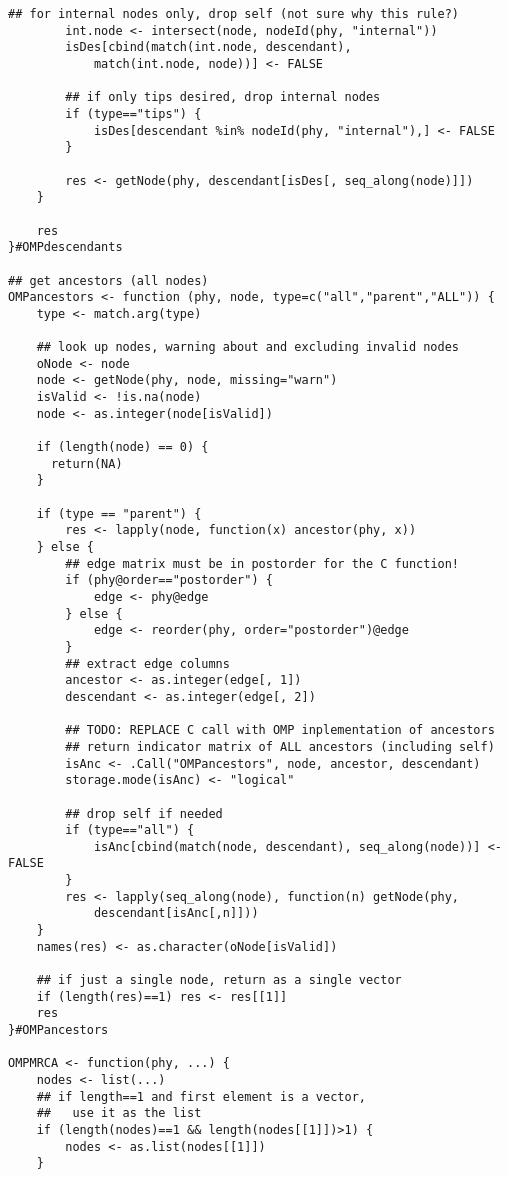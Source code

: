 \documentclass[11pt,letterpaper]{article}
\begin{document}
\begin{lstlisting}[style=MyR]
        ## for internal nodes only, drop self (not sure why this rule?)
        int.node <- intersect(node, nodeId(phy, "internal"))
        isDes[cbind(match(int.node, descendant),
            match(int.node, node))] <- FALSE
        
        ## if only tips desired, drop internal nodes
        if (type=="tips") {
            isDes[descendant %in% nodeId(phy, "internal"),] <- FALSE
        }
        
        res <- getNode(phy, descendant[isDes[, seq_along(node)]])
    }

    res
}#OMPdescendants

## get ancestors (all nodes)
OMPancestors <- function (phy, node, type=c("all","parent","ALL")) {
    type <- match.arg(type)

    ## look up nodes, warning about and excluding invalid nodes
    oNode <- node
    node <- getNode(phy, node, missing="warn")
    isValid <- !is.na(node)
    node <- as.integer(node[isValid])

    if (length(node) == 0) {
      return(NA)
    }
    
    if (type == "parent") {
        res <- lapply(node, function(x) ancestor(phy, x))
    } else {
        ## edge matrix must be in postorder for the C function!
        if (phy@order=="postorder") {
            edge <- phy@edge
        } else {
            edge <- reorder(phy, order="postorder")@edge
        }
        ## extract edge columns
        ancestor <- as.integer(edge[, 1])
        descendant <- as.integer(edge[, 2])
        
        ## TODO: REPLACE C call with OMP inplementation of ancestors
        ## return indicator matrix of ALL ancestors (including self)
        isAnc <- .Call("OMPancestors", node, ancestor, descendant)
        storage.mode(isAnc) <- "logical"

        ## drop self if needed
        if (type=="all") {
            isAnc[cbind(match(node, descendant), seq_along(node))] <- FALSE
        }
        res <- lapply(seq_along(node), function(n) getNode(phy,
            descendant[isAnc[,n]]))
    }
    names(res) <- as.character(oNode[isValid])

    ## if just a single node, return as a single vector
    if (length(res)==1) res <- res[[1]]
    res
}#OMPancestors

OMPMRCA <- function(phy, ...) {
    nodes <- list(...)
    ## if length==1 and first element is a vector,
    ##   use it as the list
    if (length(nodes)==1 && length(nodes[[1]])>1) {
        nodes <- as.list(nodes[[1]])
    }


\end{lstlisting}
\end{document}
